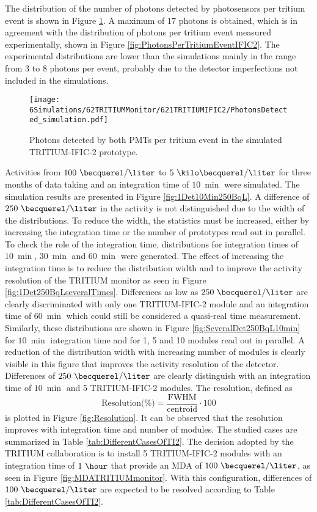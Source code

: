 The distribution of the number of photons detected by photosensors per tritium event is shown in Figure \ref{fig:SimulatedPhotonsDetected}. A maximum of $17$ photons is obtained, which is in agreement with the distribution of photons per tritium event measured experimentally, shown in Figure \ref{fig:PhotonsPerTritiumEventIFIC2}. The experimental distributions are lower than the simulations mainly in the range from $3$ to $8$ photons per event, probably due to the detector imperfections not included in the simulations.

\begin{figure}[hbtp]
\centering
\texttt{[image: 6Simulations/62TRITIUMMonitor/621TRITIUMIFIC2/PhotonsDetected\_simulation.pdf]}
\caption{Photons detected by both PMTs per tritium event in the simulated TRITIUM-IFIC-2 prototype.\label{fig:SimulatedPhotonsDetected}}
\end{figure}

Activities from $100~\becquerel/\liter$ to $5~\kilo\becquerel/\liter$ for three months of data taking and an integration time of $10~\min$ were simulated. The simulation results are presented in Figure \ref{fig:1Det10Min250BqL}. A difference of $250~\becquerel/\liter$ in the activity is not distinguished due to the width of the distributions. To reduce the width, the statistics must be increased, either by increasing the integration time or the number of prototypes read out in parallel. To check the role of the integration time, distributions for integration times of $10~\min$, $30~\min$ and $60~\min$ were generated. The effect of increasing the integration time is to reduce the distribution width and to improve the activity resolution of the TRITIUM monitor as seen in Figure \ref{fig:1Det250BqLseveralTimes}. Differences as low as $250~\becquerel/\liter$ are clearly discriminated with only one TRITIUM-IFIC-2 module and an integration time of $60~\min$ which could still be considered a quasi-real time measurement. Similarly, these distributions are shown in Figure \ref{fig:SeveralDet250BqL10min} for $10~\min$ integration time and for 1, 5 and 10 modules read out in parallel. A reduction of the distribution width with increasing number of modules is clearly visible in this figure that improves the activity resolution of the detector. Differences of $250~\becquerel/\liter$ are clearly distinguish with an integration time of $10~\min$ and 5 TRITIUM-IFIC-2 modules. The resolution, defined as
\begin{equation}
\text{Resolution(\%)}=\frac{\text{FWHM}}{\text{centroid}}\cdot{}100
\label{eq:Resolution}
\end{equation}
is plotted in Figure \ref{fig:Resolution}. It can be observed that the resolution improves with integration time and number of modules. The studied cases are summarized in Table \ref{tab:DifferentCasesOfTI2}. The decision adopted by the TRITIUM collaboration is to install 5 TRITIUM-IFIC-2 modules with an integration time of $1~\hour$ that provide an MDA of $100~\becquerel/\liter$, as seen in Figure \ref{fig:MDATRITIUMmonitor}. With this configuration, differences of $100~\becquerel/\liter$ are expected to be resolved according to Table \ref{tab:DifferentCasesOfTI2}. 

